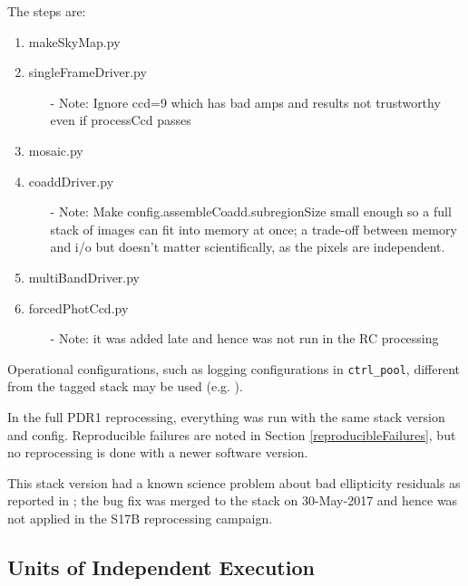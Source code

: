 \documentclass[DM,authoryear,toc]{lsstdoc}
\begin{document}
The steps are:
\begin{enumerate}
\item
makeSkyMap.py
\item
singleFrameDriver.py
\begin{enumerate}
\item [-]
Note: Ignore ccd=9 which has bad amps and results not trustworthy even if processCcd passes
\end{enumerate}
\item
mosaic.py
\item
coaddDriver.py
\begin{enumerate}
\item [-]
Note: Make config.assembleCoadd.subregionSize small enough so a full stack of images can fit into memory at once; a trade-off between memory and i/o but doesn't matter scientifically, as the pixels are independent.
\end{enumerate}
\item
multiBandDriver.py
\item
forcedPhotCcd.py
\begin{enumerate}
\item [-]
Note: it was added late and hence was not run in the RC processing
\end{enumerate}
\end{enumerate}

Operational configurations, such as logging configurations in \texttt{ctrl{\_}pool}, different from the tagged stack may be used (e.g. ).

In the full PDR1 reprocessing, everything was run with the same stack version and config. Reproducible failures are noted in Section \ref{reproducibleFailures}, but no reprocessing is done with a newer software version.

This stack version had a known science problem about bad ellipticity residuals as reported in ; the bug fix  was merged to the stack on 30-May-2017 and hence was not applied in the S17B reprocessing campaign.

\subsection{Units of Independent Execution}
\end{document}
